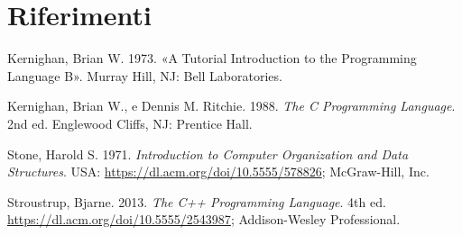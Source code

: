 \documentclass[
  letterpaper,
]{scrbook}
\newlength{\cslhangindent}
\newenvironment{CSLReferences}[2] %
 {\begin{list}{}{%
  \setlength{\itemindent}{0pt}
  \setlength{\leftmargin}{0pt}
  \setlength{\parsep}{0pt}
  \ifodd #1
   \setlength{\leftmargin}{\cslhangindent}
   \setlength{\itemindent}{-1\cslhangindent}
  \fi
  \setlength{\itemsep}{#2\baselineskip}}}
 {\end{list}}
\begin{document}
\chapter*{Riferimenti}\label{riferimenti}


\label{refs}
\begin{CSLReferences}{1}{0}
Kernighan, Brian W. 1973. {«A Tutorial Introduction to the Programming
Language B»}. Murray Hill, NJ: Bell Laboratories.

Kernighan, Brian W., e Dennis M. Ritchie. 1988. \emph{The C Programming
Language}. 2nd ed. Englewood Cliffs, NJ: Prentice Hall.

Stone, Harold S. 1971. \emph{Introduction to Computer Organization and
Data Structures}. USA: \url{https://dl.acm.org/doi/10.5555/578826};
McGraw-Hill, Inc.

Stroustrup, Bjarne. 2013. \emph{The C++ Programming Language}. 4th ed.
\url{https://dl.acm.org/doi/10.5555/2543987}; Addison-Wesley
Professional.

\end{CSLReferences}


\backmatter
\end{document}
